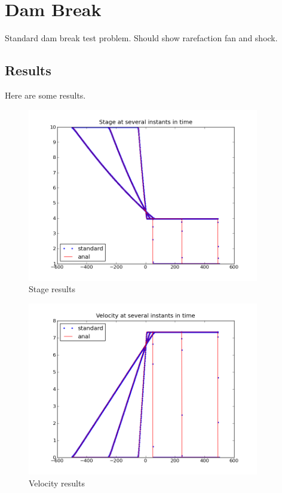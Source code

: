 
\section{Dam Break}

Standard dam break test problem. Should show rarefaction fan and shock. 

\subsection{Results}


Here are some results.

\begin{figure}[h]
\begin{center}
\includegraphics[width=0.9\textwidth]{stage_plot.png}
\end{center}
\caption{Stage results}
\end{figure}


\begin{figure}[h]
\begin{center}
\includegraphics[width=0.9\textwidth]{xvel_plot.png}
\end{center}
\caption{Velocity results}
\end{figure}


\endinput